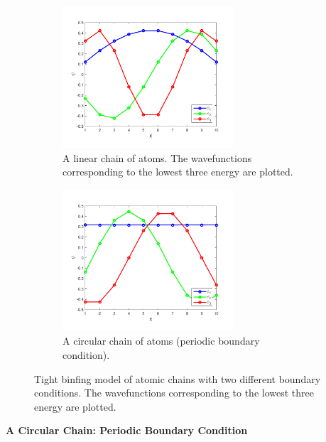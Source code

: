 {\begin{figure}
	\centering
	\begin{subfigure}{0.45\textwidth}
		\centering
		\includegraphics[width=2.5in]{10.matrix3/tight_binding1.pdf}
		\caption{A linear chain of atoms.  The wavefunctions corresponding to the lowest three energy are plotted.}
		\label{fig:tight_binding1}
	\end{subfigure}
	\begin{subfigure}{0.45\textwidth}
		\centering
		\includegraphics[width=2.5in]{10.matrix3/tight_binding2.pdf}
		\caption{A circular chain of atoms (periodic boundary condition).}
		\label{fig:tight_binding2}
	\end{subfigure}
\caption{Tight binfing model of atomic chains with two different boundary conditions. The wavefunctions corresponding to the lowest three energy are plotted.}
\label{fig:tight_binding}
\end{figure}

\bigskip
\noindent
\textbf{A Circular Chain: Periodic Boundary Condition}

}
